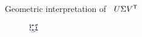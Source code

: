 \documentclass{beamer}
\begin{document}
\begin{frame}[t]{Geometric interpretation of \ $U\Sigma V^{{\sf T}}$}
\begin{figure}[H]
	\begin{center}
	\includegraphics[width = 0.6\linewidth]{./svd.pdf}
	\end{center}
\end{figure}

\end{frame}
\end{document}
